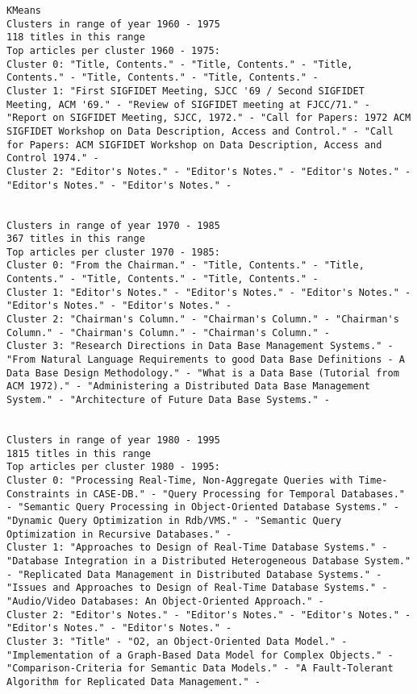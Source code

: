 \documentclass[11pt]{article}
\begin{document}
\begin{verbatim}
KMeans
Clusters in range of year 1960 - 1975
118 titles in this range
Top articles per cluster 1960 - 1975:
Cluster 0: "Title, Contents." - "Title, Contents." - "Title, Contents." - "Title, Contents." - "Title, Contents." - 
Cluster 1: "First SIGFIDET Meeting, SJCC '69 / Second SIGFIDET Meeting, ACM '69." - "Review of SIGFIDET meeting at FJCC/71." - "Report on SIGFIDET Meeting, SJCC, 1972." - "Call for Papers: 1972 ACM SIGFIDET Workshop on Data Description, Access and Control." - "Call for Papers: ACM SIGFIDET Workshop on Data Description, Access and Control 1974." - 
Cluster 2: "Editor's Notes." - "Editor's Notes." - "Editor's Notes." - "Editor's Notes." - "Editor's Notes." - 


Clusters in range of year 1970 - 1985
367 titles in this range
Top articles per cluster 1970 - 1985:
Cluster 0: "From the Chairman." - "Title, Contents." - "Title, Contents." - "Title, Contents." - "Title, Contents." - 
Cluster 1: "Editor's Notes." - "Editor's Notes." - "Editor's Notes." - "Editor's Notes." - "Editor's Notes." - 
Cluster 2: "Chairman's Column." - "Chairman's Column." - "Chairman's Column." - "Chairman's Column." - "Chairman's Column." - 
Cluster 3: "Research Directions in Data Base Management Systems." - "From Natural Language Requirements to good Data Base Definitions - A Data Base Design Methodology." - "What is a Data Base (Tutorial from ACM 1972)." - "Administering a Distributed Data Base Management System." - "Architecture of Future Data Base Systems." - 


Clusters in range of year 1980 - 1995
1815 titles in this range
Top articles per cluster 1980 - 1995:
Cluster 0: "Processing Real-Time, Non-Aggregate Queries with Time-Constraints in CASE-DB." - "Query Processing for Temporal Databases." - "Semantic Query Processing in Object-Oriented Database Systems." - "Dynamic Query Optimization in Rdb/VMS." - "Semantic Query Optimization in Recursive Databases." - 
Cluster 1: "Approaches to Design of Real-Time Database Systems." - "Database Integration in a Distributed Heterogeneous Database System." - "Replicated Data Management in Distributed Database Systems." - "Issues and Approaches to Design of Real-Time Database Systems." - "Audio/Video Databases: An Object-Oriented Approach." - 
Cluster 2: "Editor's Notes." - "Editor's Notes." - "Editor's Notes." - "Editor's Notes." - "Editor's Notes." - 
Cluster 3: "Title" - "O2, an Object-Oriented Data Model." - "Implementation of a Graph-Based Data Model for Complex Objects." - "Comparison-Criteria for Semantic Data Models." - "A Fault-Tolerant Algorithm for Replicated Data Management." - 



\end{verbatim}
\end{document}
